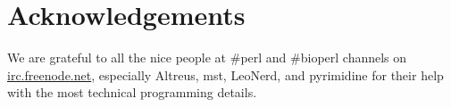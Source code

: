 \documentclass[10pt,a4paper,twocolumn,article]{memoir}
\begin{document}

  \section{Acknowledgements}
    We are grateful to all the nice people at \#perl and \#bioperl channels on
    \url{irc.freenode.net}, especially Altreus, mst, LeoNerd, and pyrimidine for
    their help with the most technical programming details.

  
  

  \onecolumn
  \label{tab:histone-catalogue}
  
\end{document}
